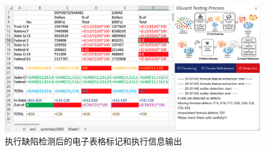 \begin{figure}[tbp]    
    \centering
    \includegraphics[width=\textwidth]{figure/eg/eguard-4.png}
    \caption{\eg 执行缺陷检测后的电子表格标记和执行信息输出}
    \label{figure-eg4}
\end{figure}